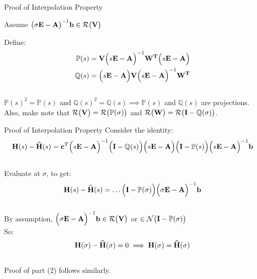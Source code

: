 \begin{frame}{Proof of Interpolation Property}

Assume \(\big( \sigma{\bf E}-{\bf A} \big)^{-1}{\bf b} \in \mathcal{R}\big({\bf V}\big) \)\\

\bigskip

Define:
\begin{align*}
    \mathbb{P}(s) & = {\bf V} \Big( s{\bf E-A} \Big)^{-1} {\bf W^{T}} \Big( s{\bf E-A} \Big)\\
    \mathbb{Q}(s) & = \Big( s{\bf E-A} \Big) {\bf V} \Big( s{\bf E-A} \Big)^{-1} {\bf W^{T}}
\end{align*}
\\
\bigskip
\(\mathbb{P}(s)^2 =\mathbb{P}(s)\) and \(\mathbb{Q}(s)^2 = \mathbb{Q}(s) \implies \mathbb{P}(s)\) and \(\mathbb{Q}(s)\) are projections.
\\
\bigskip
Also, make note that \( \mathcal{R}\big( {\bf V} \big) =  \mathcal{R}\big( \mathbb{P}(\sigma) \big)  \) and \(\mathcal{R}\big({\bf W}\big) = \mathcal{R}\big({\bf I - \mathbb{Q}(\sigma)}\big) \).

\end{frame}


\begin{frame}{Proof of Interpolation Property}
Consider the identity:
$$
    {\bf H}(s) -{\bf \widehat{H}}(s) = 
    {\bf c}^T \Big( s{\bf E-A} \Big)^{-1} \Big( {\bf I} - \mathbb{Q}(s) \Big) \Big( s{\bf E-A} \Big) \Big( {\bf I} - \mathbb{P}(s) \Big) \Big( s{\bf E-A} \Big)^{-1} {\bf b}
$$
\\


Evaluate at \(\sigma\), to get:
$$
    {\bf H}(s) -{\bf \widehat{H}}(s) = \dots \Big( {\bf I} - \mathbb{P}(\sigma)\Big) \Big( \sigma {\bf E-A} \Big)^{-1} {\bf b}
$$
\\
By assumption, \(\Big( \sigma {\bf E-A} \Big)^{-1} {\bf b} \in \mathcal{R}\big({\bf V}\big) \) or \( \in \mathcal{N}\big( {\bf I} - \mathbb{P}(\sigma) \big)\)\\
\bigskip
So:
$$ {\bf H}(\sigma) -{\bf \widehat{H}}(\sigma)  = 0 \implies {\bf H}(\sigma)  = {\bf \widehat{H}}(\sigma)
$$\\
\bigskip
Proof of part (2) follows similarly.    
\end{frame}

